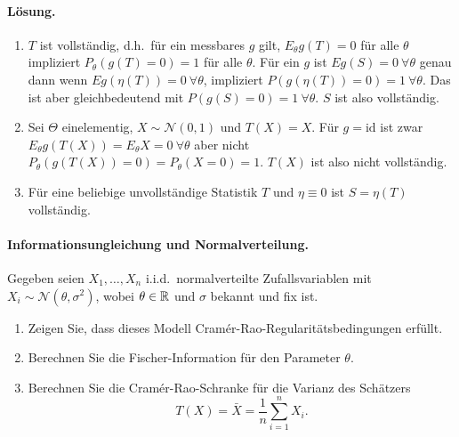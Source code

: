 \paragraph*{Lösung.}
\begin{enumerate}

    \item $T$ ist vollständig, d.h.\ für ein messbares $g$ gilt, $E_\theta g(T) = 0$ für alle $\theta$ impliziert 
        $P_\theta \left( g(T)=0  \right)=1$ für alle $\theta$. Für ein $g$ ist
        $E g(S)=0 \ \forall \theta$ genau dann wenn $E g(\eta(T))=0 \ \forall \theta$, impliziert
        $P\left( g(\eta(T))=0 \right)=1 \ \forall \theta$. Das ist aber gleichbedeutend mit 
        $P\left( g(S)=0 \right)=1 \ \forall \theta$. $S$ ist also vollständig. 

    \item Sei $\Theta$ einelementig, $X\sim \mathcal N(0,1)$ und $T(X)=X$. Für $g=\textrm{id}$ ist zwar
        $E_\theta g(T(X)) = E_\theta X = 0 \ \forall \theta$ aber nicht 
        $P_\theta \left( g(T(X))=0 \right)=  P_\theta \left( X=0 \right)=1$. $T(X)$ ist also nicht vollständig. 

    \item Für eine beliebige unvollständige Statistik $T$ und $\eta\equiv 0$ ist $S=\eta(T)$ vollständig. 

\end{enumerate}







\paragraph{Informationsungleichung und Normalverteilung. } Gegeben seien $X_1,\ldots,X_n$
i.i.d.\ normalverteilte Zufallsvariablen mit $X_i\sim \mathcal N(\theta, \sigma^2)$, wobei $\theta\in\mathbb R$
und $\sigma$ bekannt und fix ist.
\begin{enumerate}
    \item Zeigen Sie, dass dieses Modell Cram\'er-Rao-Regularitätsbedingungen erfüllt.
    \item Berechnen Sie die Fischer-Information für den Parameter $\theta$.
    \item Berechnen Sie die Cram\'er-Rao-Schranke für die Varianz des Schätzers
        \begin{equation}
            T(X)=\bar X = \frac{1}{n} \sum_{i=1}^{n}X_i.
        \end{equation}
\end{enumerate}



